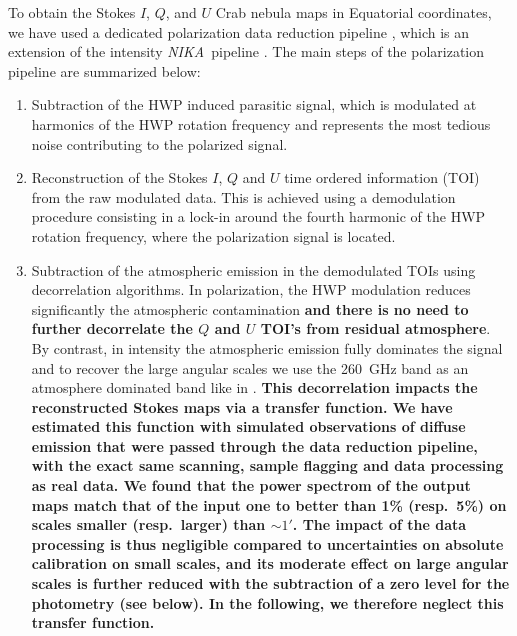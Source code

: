 \documentclass[twocolumn,traditabstract]{aa}
\def\NIKA{\textit{NIKA}}
\begin{document}
To obtain the Stokes $I$, $Q$, and $U$ Crab nebula maps in Equatorial coordinates, we have used a dedicated
polarization data reduction pipeline \citep{ritacco2017}, which is an extension
of the intensity \NIKA\ pipeline \citep{catalano2014,adam2013}. The main steps
of the polarization pipeline are summarized below:
\begin{enumerate}
\item  Subtraction of the HWP induced parasitic signal, which is modulated at harmonics of the HWP rotation frequency and represents the most tedious noise contributing to the polarized signal. 
\item Reconstruction of the Stokes $I$, $Q$ and $U$ time ordered information
  (TOI) from the raw modulated data. This is achieved using a demodulation
  procedure consisting in a lock-in around the fourth harmonic of the HWP rotation frequency, where the polarization signal is located.
\item Subtraction of the atmospheric emission in the demodulated TOIs using
  decorrelation algorithms. In polarization, the HWP modulation reduces
  significantly the atmospheric contamination {\bf and there is no need to
    further decorrelate the $Q$ and $U$ TOI's from residual atmosphere}. By contrast, in
  intensity the atmospheric emission fully dominates the signal and to recover
  the large angular scales we use the 260~GHz band as an atmosphere
  dominated band like in \cite{adam2013}. {\bf This decorrelation impacts the
    reconstructed Stokes maps via a transfer function. We have estimated this function
    with simulated observations of diffuse emission that were passed through the
    data reduction pipeline, with the exact same scanning, sample flagging and data
    processing as real data. We found that the power spectrom of the output maps
    match that of the input one to better than 1\% (resp.~5\%) on scales smaller
    (resp.~larger) than $\sim 1'$. The impact of the data processing is thus
    negligible compared to uncertainties on absolute calibration on small
    scales, and its moderate effect on large angular scales is further reduced
    with the subtraction of a zero level for the photometry (see below). In the
    following, we therefore neglect this transfer function.}


\end{enumerate}
\end{document}
